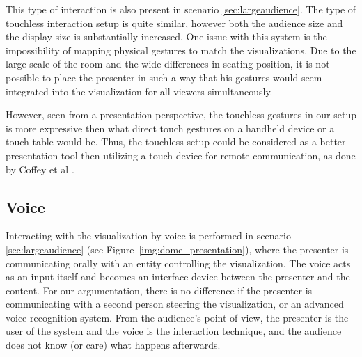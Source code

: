 \documentclass[review,journal]{vgtc}         %
\newcommand{\todo}[1]{\textbf{\textcolor{red}{[TODO: {#1}]}}}
\begin{document}
This type of interaction is also present in scenario \ref{sec:largeaudience}. The type of touchless interaction setup is quite similar, however both the audience size and the display size is substantially increased. One issue with this system is the impossibility of mapping physical gestures to match the visualizations. Due to the large scale of the room and the wide differences in seating position, it is not possible to place the presenter in such a way that his gestures would seem integrated into the visualization for all viewers simultaneously.

However, seen from a presentation perspective, the touchless gestures in our setup is more expressive then what direct touch gestures on a handheld device or a touch table would be.
Thus, the touchless setup could be considered as a better presentation tool then utilizing a touch device for remote communication, as done by Coffey et al \cite{Coffey:2012:ISW:2360744.2360843}.





\subsection{Voice}

Interacting with the visualization by voice is performed in scenario \ref{sec:largeaudience} (see Figure~\ref{img:dome_presentation}), where the presenter is communicating orally with an entity controlling the visualization. The voice acts as an input itself and becomes an interface device between the presenter and the content.
For our argumentation, there is no difference if the presenter is communicating with a second person steering the visualization, or an advanced voice-recognition system.
From the audience's point of view, the presenter is the user of the system and the voice is the interaction technique, and the audience does not know (or care) what happens afterwards.
\end{document}
